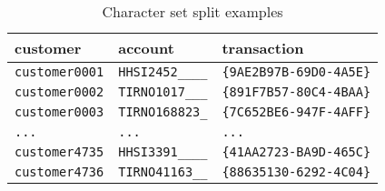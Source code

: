 \begin{table}[h]
\centering
\begin{tabular}{@{}lll@{}}
\toprule
customer            & account             & transaction                 \\ \midrule
\verb|customer0001| & \verb|HHSI2452____| & \verb|{9AE2B97B-69D0-4A5E}| \\
\verb|customer0002| & \verb|TIRNO1017___| & \verb|{891F7B57-80C4-4BAA}| \\
\verb|customer0003| & \verb|TIRNO168823_| & \verb|{7C652BE6-947F-4AFF}| \\
\verb|...|          & \verb|...|          & \verb|...|                  \\
\verb|customer4735| & \verb|HHSI3391____| & \verb|{41AA2723-BA9D-465C}| \\
\verb|customer4736| & \verb|TIRNO41163__| & \verb|{88635130-6292-4C04}| \\ \bottomrule
\end{tabular}
\caption{Character set split examples}
\label{tab:pd:charsetsplit:examples}
\end{table}